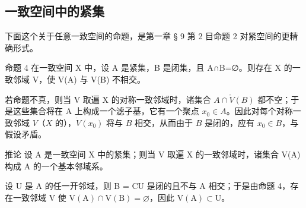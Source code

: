 \subsection{一致空间中的紧集}

下面这个关于任意一致空间的命题，是第一章 § 9 第 2 目命题 2 对紧空间的更精确形式。

命题 4 在一致空间 X 中，设 A 是紧集，B 是闭集，且 A∩B=∅。则存在 X 的一致邻域 V，使 V(A) 与 V(B) 不相交。

若命题不真，则当 V 取遍 X 的对称一致邻域时，诸集合 \(A \cap \mathring{V}(B)\) 都不空；于是这些集合将在 A 上构成一个滤子基，它有一个聚点 \(x_0 \in A\)。因此对每个对称一致邻域 \(V\)（\(X\) 的），\(\dot{V}(x_0)\) 将与 \(B\) 相交，从而由于 \(B\) 是闭的，应有 \(x_0 \in B\)，与假设矛盾。

推论 设 A 是一致空间 X 中的紧集；则当 V 取遍 X 的一致邻域时，诸集合 V(A) 构成 A 的一个基本邻域系。

设 U 是 A 的任一开邻域，则 B = CU 是闭的且不与 A 相交；于是由命题 4，存在一致邻域 V 使 \(\mathrm{V}(\mathrm{A}) \cap \mathrm{V}(\mathrm{B}) = \varnothing\)，因此 \(\mathrm{V}(\mathrm{A}) \subset \mathrm{U}\)。

